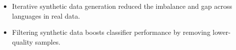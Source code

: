 \begin{tcolorbox}[colback=gray!10, colframe=black!80, title=Takeaways., sharp corners, boxrule=0.3pt, fonttitle=\bfseries]
\begin{itemize}[leftmargin=*]
    \item Iterative synthetic data generation reduced the imbalance and gap across languages in real data.
    \item Filtering synthetic data boosts classifier performance by removing lower-quality samples.
\end{itemize}
\end{tcolorbox}




